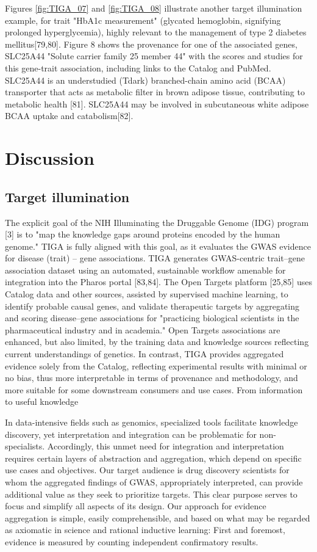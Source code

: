 Figures \ref{fig:TIGA_07} and \ref{fig:TIGA_08} illustrate another target illumination example, for trait "HbA1c measurement" (glycated hemoglobin, signifying prolonged hyperglycemia), highly relevant to the management of type 2 diabetes mellitus[79,80]. Figure 8 shows the provenance for one of the associated genes, SLC25A44 "Solute carrier family 25 member 44" with the scores and studies for this gene-trait association, including links to the Catalog and PubMed. SLC25A44 is an understudied (Tdark) branched-chain amino acid (BCAA) transporter that acts as metabolic filter in brown adipose tissue, contributing to metabolic health [81]. SLC25A44 may be involved in subcutaneous white adipose BCAA uptake and catabolism[82]. 

\section{Discussion}

\subsection{Target illumination}

The explicit goal of the NIH Illuminating the Druggable Genome (IDG) program [3] is to "map the knowledge gaps around proteins encoded by the human genome." TIGA is fully aligned with this goal, as it evaluates the GWAS evidence for disease (trait) – gene associations. TIGA generates GWAS-centric trait–gene association dataset using an automated, sustainable workflow amenable for integration into the Pharos portal [83,84]. The Open Targets platform [25,85] uses Catalog data and other sources, assisted by supervised machine learning, to identify probable causal genes, and validate therapeutic targets by aggregating and scoring disease–gene associations for "practicing biological scientists in the pharmaceutical industry and in academia." Open Targets associations are enhanced, but also limited, by the training data and knowledge sources reflecting current understandings of genetics. In contrast, TIGA provides aggregated evidence solely from the Catalog, reflecting experimental results with minimal or no bias, thus more interpretable in terms of provenance and methodology, and more suitable for some downstream consumers and use cases.
From information to useful knowledge

In data-intensive fields such as genomics, specialized tools facilitate knowledge discovery, yet interpretation and integration can be problematic for non-specialists. Accordingly, this unmet need for integration and interpretation requires certain layers of abstraction and aggregation, which depend on specific use cases and objectives. Our target audience is drug discovery scientists for whom the aggregated findings of GWAS, appropriately interpreted, can provide additional value as they seek to prioritize targets. This clear purpose serves to focus and simplify all aspects of its design. Our approach for evidence aggregation is simple, easily comprehensible, and based on what may be regarded as axiomatic in science and rational inductive learning: First and foremost, evidence is measured by counting independent confirmatory results.

